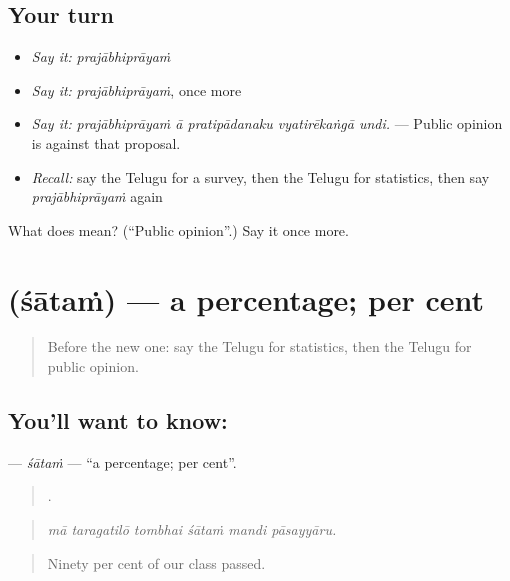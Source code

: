 \subsection*{Your turn}
\begin{itemize}
\raggedright
  \item \emph{Say it:} \emph{prajābhiprāyaṁ}
  \item \emph{Say it:} \emph{prajābhiprāyaṁ}, once more
  \item \emph{Say it:} \emph{prajābhiprāyaṁ ā pratipādanaku vyatirēkaṅgā undi.} — Public opinion is against that proposal.
  \item \emph{Recall:} say the Telugu for a survey, then the Telugu for statistics, then say \emph{prajābhiprāyaṁ} again
\end{itemize}

\begin{tcolorbox}[breakable,colback=teal!4,colframe=teal!35!black,title={Before you move on}]
What does  mean? (\textquotedblleft{}Public opinion\textquotedblright{}.) Say it once more.
\end{tcolorbox}
\section[\texorpdfstring{\te{శాతం} (śātaṁ)}{శాతం (śātaṁ)}]{ (śātaṁ) — a percentage; per cent}

\label{lesson:TE-C411-satam}



\begin{quote}
Before the new one: say the Telugu for statistics, then the Telugu for public opinion.
\end{quote}

\subsection*{You'll want to know: }
\textbf{} — \emph{śātaṁ} — \textquotedblleft{}a percentage; per cent\textquotedblright{}.

\begin{quote}
     .
\end{quote}

\begin{quote}
\emph{mā taragatilō tombhai śātaṁ mandi pāsayyāru.}
\end{quote}

\begin{quote}
Ninety per cent of our class passed.
\end{quote}

